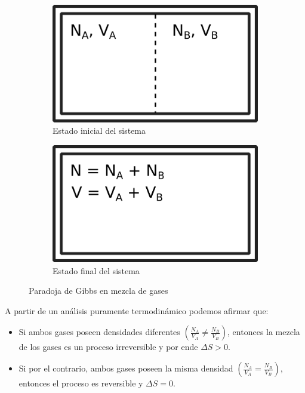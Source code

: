 \documentclass[a4paper,11pt]{article}
\begin{document}
\begin{figure}[h!]
    \centering
    \begin{subfigure}[b]{0.3\textwidth}
        \includegraphics[width=\textwidth]{figs/paradoja-gibbs-1.png}
        \caption{Estado inicial del sistema}
        \label{fig:gibbs-tabique}
    \end{subfigure}
    \hspace{0.1\textwidth}
    \begin{subfigure}[b]{0.3\textwidth}
        \includegraphics[width=\textwidth]{figs/paradoja-gibbs-2.png}
        \caption{Estado final del sistema}
        \label{fig:gibbs-mezcla}
    \end{subfigure}
    \caption{Paradoja de Gibbs en mezcla de gases}
\end{figure}

A partir de un análisis puramente termodinámico podemos afirmar que:

\begin{itemize}

\item{Si ambos gases poseen densidades diferentes
      $\left( \frac{N_A}{V_A} \neq \frac{N_B}{V_B} \right)$, entonces la
      mezcla de los gases es un proceso irreversible y por ende
      $ \Delta S > 0 $.
      }

\item{Si por el contrario, ambos gases poseen la misma densidad
      $\left( \frac{N_A}{V_A} = \frac{N_B}{V_B} \right)$, entonces
      el proceso es reversible y $ \Delta S = 0 $.
      }

\end{itemize}
\end{document}
